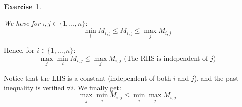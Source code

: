 \documentclass{article}
\newtheorem{exo}{Exercise}
\begin{document}
\begin{exo}{\ \\}


We have for $i,j \in \{1, \dots, n\}\colon$ \[ \min_{i} M_{i,j} \leq M_{i,j} \le \max_{j} M_{i,j}   \]
\end{exo}

Hence, for $i \in \{1, \dots, n\}\colon$ \[ \max_{j} \min_{i} M_{i,j} \le \max_{j} M_{i,j} \text{ (The RHS is independent of $j$)} \]

Notice that the LHS is a constant (independent of both $i$ and $j$), and the past inequality is verified $\forall i$. We finally get: \[ \max_{j} \min_{i} M_{i,j} \le  \min_{i} \max_{j} M_{i,j}  \]
\end{document}
